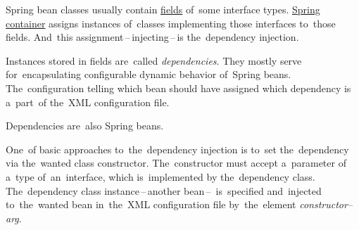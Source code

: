 \label{dependencyinjection}
Spring bean classes usually contain \hyperref[variablefieldproperty]{fields} of~some interface types. \hyperref[springcontainrer]{Spring container} assigns instances of~classes implementing those interfaces to~those fields. And~this assignment\,--\,injecting\,--\,is the~dependency injection.

Instances stored in fields are~called \textit{dependencies}. They mostly serve for~encapsulating configurable dynamic behavior of~Spring beans. The~configuration telling which bean should have assigned which dependency is a~part~of the~XML configuration file.

\newline\note Dependencies are~also Spring beans.

\label{constructorinjection}
One~of basic approaches to~the~dependency injection is to~set the~dependency via the~wanted class constructor. The~constructor must accept a~parameter of a~type of~an~interface, which is~implemented by the~dependency class. The~dependency class instance\,--\,another bean\,--\, is~specified and~injected to~the~wanted bean in~the~XML configuration file by~the~element \textit{constructor--arg}.
\newpage

